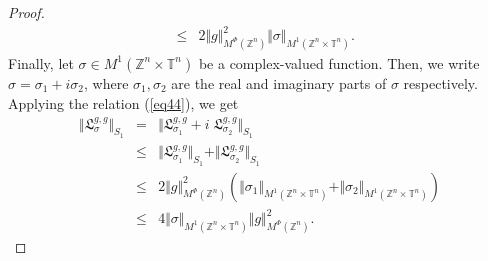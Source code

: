 \documentclass[10pt,a4paper]{amsart}
\def \T{{\mathbb T}}
\def \Z{{\mathbb Z}}
\begin{document}
\begin{proof}
\begin{eqnarray}
& \leq & 2  \Vert g \Vert^2_{M^{\Phi}(\Z^n)} \Vert \sigma \Vert_{M^1(\Z^n \times \T^n)}.
\end{eqnarray}
Finally, let $\sigma \in  M^1(\Z^n \times \T^n)$ be a complex-valued function. Then, we write $\sigma=\sigma_1+ i \sigma_2$, where $\sigma_1, \sigma_2$ are the real and imaginary parts of $\sigma$ respectively. Applying the relation (\ref{eq44}), we get
\begin{eqnarray*}
\Vert \mathfrak{L}^{g, g}_{\sigma} \Vert_{S_1}
& = & \Vert \mathfrak{L}^{g, g}_{\sigma_1}+i \; \mathfrak{L}^{g, g}_{\sigma_2} \Vert_{S_1}  \\
& \leq & \Vert \mathfrak{L}^{g, g}_{\sigma_1} \Vert_{S_1} + \Vert \mathfrak{L}^{g, g}_{\sigma_2} \Vert_{S_1} \\
&\leq & 2  \Vert g \Vert^2_{M^{\Phi}(\Z^n)} (\Vert \sigma_1 \Vert_{M^1(\Z^n \times \T^n)} + \Vert \sigma_2 \Vert_{M^1(\Z^n \times \T^n)}) \nonumber \\
& \leq & 4 \Vert \sigma \Vert_{M^1(\Z^n \times \T^n)}  \Vert g \Vert^2_{M^{\Phi}(\Z^n)}  .
\end{eqnarray*}
\end{proof}
\end{document}
